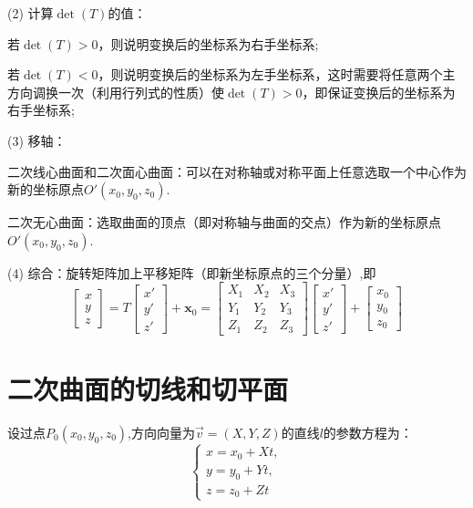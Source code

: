 \par (2) 计算$\det(T)$的值：
\par \kg \kg 若$\det(T)>0$，则说明变换后的坐标系为右手坐标系;
\par \kg \kg 若$\det(T)<0$，则说明变换后的坐标系为左手坐标系，这时需要将任意两个主方向调换一次（利用行列式的性质）使$\det(T)>0$，即保证变换后的坐标系为右手坐标系;

\par (3) {\color{dy}移轴}：
\par \kg \kg 二次线心曲面和二次面心曲面：可以在{\color{dy}对称轴}或{\color{dy}对称平面}上{\color{dy}任意选取一个中心}作为新的坐标原点$O'(x_0,y_0,z_0)$.
\par \kg \kg 二次无心曲面：选取曲面的顶点（即对称轴与曲面的交点）作为新的坐标原点$O'(x_0,y_0,z_0)$.

\par (4) 综合：旋转矩阵加上平移矩阵（即新坐标原点的三个分量）,即
\begin{equation}
\left[ 
\begin{array}{c}
x \\
y \\
z
\end{array}
\right] 
=
T
\left[ 
\begin{array}{c}
x' \\
y' \\
z'
\end{array}
\right] 
+
\bm{x}_0
=
\left[ 
\begin{array}{ccc}
X_1 & X_2 & X_3\\
Y_1 & Y_2 & Y_3\\
Z_1 & Z_2 & Z_3
\end{array}
\right] 
\left[ 
\begin{array}{c}
x' \\
y' \\
z'
\end{array}
\right] 
+
\left[ 
\begin{array}{c}
x_0 \\
y_0 \\
z_0
\end{array}
\right]
\end{equation}

\section{二次曲面的切线和切平面}
设过点$P_0(x_0,y_0,z_0)$,方向向量为$\overrightarrow{v}=(X,Y,Z)$的直线$l$的参数方程为：
\begin{equation}
\begin{cases}
x=x_0+Xt,\\
y=y_0+Yt,\\
z=z_0+Zt
\end{cases}
\end{equation}

